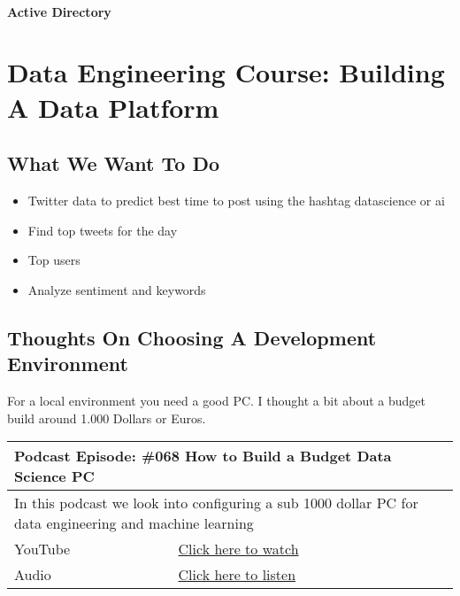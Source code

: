 \documentclass[12pt, numbers=noenddot]{scrreprt} %
\begin{document}
\subsection{Active Directory}




\part{Data Engineering Course: Building A Data Platform}

\chapter{What We Want To Do}

\begin{itemize}
\item Twitter data to predict best time to post using the hashtag datascience or ai
\item Find top tweets for the day
\item Top users
\item Analyze sentiment and keywords
\end{itemize}


\chapter{Thoughts On Choosing A Development Environment}

For a local environment you need a good PC. I thought a bit about a budget build around 1.000 Dollars or Euros.

\begin{table}[h]
\begin{tabular}{ll}
\hline
\multicolumn{2}{l}{\textbf{Podcast Episode:} \#068 How to Build a Budget Data Science PC} \\ \hline
\multicolumn{2}{p{15cm}}{In this podcast we look into configuring a sub 1000 dollar PC for data engineering and machine learning}         \\ \hline
\multicolumn{1}{l|}{YouTube}   & \href{https://youtu.be/00NWR-II6ek}{Click here to watch}   \\ 
\multicolumn{1}{l|}{Audio}     & \href{https://anchor.fm/andreaskayy/episodes/068-A-Budget-Data-Science-PC-Build-e45inh}{Click here to listen}   \\ \hline
\end{tabular}
\end{table}
\end{document}
